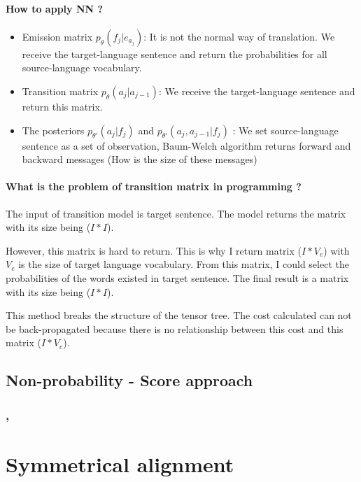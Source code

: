 \documentclass{article}
\begin{document}
\paragraph{How to apply NN ?}
\begin{itemize}
\item Emission matrix $p_{\theta}(f_j | e_{a_j})$: It is not the normal way of translation. We receive the target-language sentence and return the probabilities for all source-language vocabulary.
\item Transition matrix $p_{\theta}(a_j | a_{j-1})$: We receive the target-language sentence and return this matrix.
\item The posteriors $p_{\theta'}(a_j|f_j)$ and $p_{\theta'}(a_j, a_{j-1}|f_j)$ : We set source-language sentence as a set of observation, Baum-Welch algorithm returns forward and backward messages (How is the size of these messages)
\end{itemize}

\paragraph{What is the problem of transition matrix in programming ?}
The input of transition model is target sentence. The model returns the matrix with its size being ($I * I$). 

However, this matrix is hard to return. This is why I return matrix ($I * V_e$) with $V_e$ is the size of target language vocabulary. From this matrix, I could select the probabilities of the words existed in target sentence. The final result is a matrix with its size being ($I * I$).

This method breaks the structure of the tensor tree. The cost calculated can not be back-propagated because there is no relationship between this cost and this matrix ($I * V_e$).

\subsection{Non-probability - Score approach}
\subsubsection{\cite{Yang13word}, \cite{Tamura14recurrent}}



\section{Symmetrical alignment}
\end{document}
